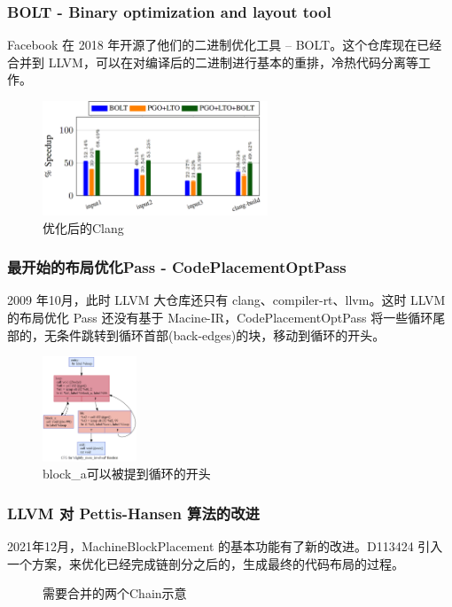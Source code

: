 \begin{frame}
    \frametitle{BOLT - Binary optimization and layout tool}

    Facebook 在 2018 年开源了他们的二进制优化工具 -- BOLT\cite{facebook2018bolt}\cite{panchenko2019bolt}。这个仓库现在已经合并到 LLVM，可以在对编译后的二进制进行基本的重排，冷热代码分离等工作。

    \begin{figure}
        \centering
        \includegraphics[width=0.6\textwidth]{images/perf_improv_clang.png}
        \caption{优化后的Clang}
    \end{figure}

\end{frame}

\begin{frame}
    \frametitle{最开始的布局优化Pass - CodePlacementOptPass}

    2009 年10月，此时 LLVM 大仓库还只有 clang、compiler-rt、llvm。这时 LLVM 的布局优化 Pass 还没有基于 Macine-IR，CodePlacementOptPass \cite{llvmcodeplacementopt2009}将一些循环尾部的，无条件跳转到循环首部(back-edges)的块，移动到循环的开头。

    \begin{figure}
        \centering
        \includegraphics[width=0.25\textwidth]{images/slightly_more_involved.png}
        \caption{block\_a可以被提到循环的开头}
    \end{figure}

\end{frame}


\begin{frame}
    \frametitle{LLVM 对 Pettis-Hansen 算法的改进}

    2021年12月，MachineBlockPlacement 的基本功能有了新的改进。D113424\cite{llvmexttspbbl2021} 引入一个方案，来优化已经完成链剖分之后的，生成最终的代码布局的过程。

    \begin{figure}
        
        \caption{需要合并的两个Chain示意}
    \end{figure}

\end{frame}